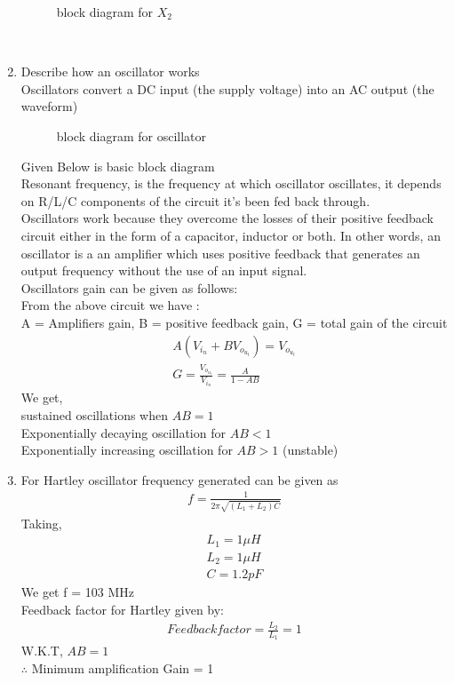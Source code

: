 \begin{enumerate}[label=\thesubsection.\arabic*.,ref=\thesubsection.\theenumi]
\begin{figure}[!ht]
\begin{center}
		\resizebox{\columnwidth}{!}{}
	\end{center}
\caption{block diagram for $X_2$}
\label{fig:block2}
\end{figure}
\\
\item Describe how an oscillator works \\
\solution Oscillators convert a DC input (the supply voltage) into an AC output (the waveform) \\
\begin{figure}[!ht]
    \begin{center}
		
		\resizebox{\columnwidth}{!}{}
	\end{center}
\caption{block diagram for oscillator}
\label{fig:block2}
\end{figure}
Given Below is basic block diagram\\
Resonant frequency, is the frequency at which oscillator oscillates, it depends on R/L/C components of the circuit it's been fed back through.\\
Oscillators work because they overcome the losses of their positive feedback circuit either in the form of a capacitor, inductor or both. In other words, an oscillator is a an amplifier which uses positive feedback that generates an output frequency without the use of an input signal.\\
Oscillators gain can be given as follows:\\
From the above circuit we have :\\
A = Amplifiers gain, B = positive feedback gain, G = total gain of the circuit
\begin{align}
    A(V_i_n + BV_o_u_t) =V_o_u_t \\
    G = \frac{V_o_u_t}{V_i_n} = \frac{A}{1 - AB}
\end{align}
We get,\\
sustained oscillations when $AB = 1$\\
Exponentially decaying oscillation for $AB<1$ \\
Exponentially increasing oscillation for $AB >1$ (unstable)\\
\newline
\item For Hartley oscillator frequency generated can be given as 
\begin{align}
    f = \frac{1}{2\pi\sqrt{(L_1 + L_2)C}}
\end{align}
Taking,
\begin{align}
   L_1 = 1 \mu H\\
   L_2 = 1 \mu H\\
   C = 1.2 pF
\end{align}
We get f = 103 MHz\\
Feedback factor for Hartley given by:
\begin{align}
Feedback factor =\frac{L_2}{L_1}= 1
\end{align}
W.K.T, $AB = 1$\\
$\therefore$ Minimum amplification Gain = 1
\end{enumerate}
